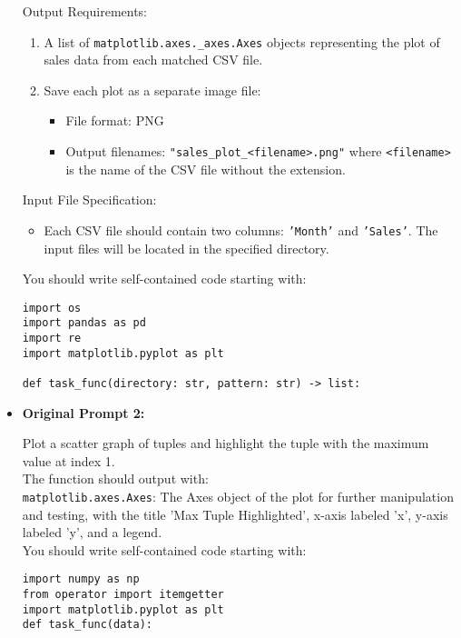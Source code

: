 \begin{itemize}
\begin{tcolorbox}[colback=blue!5!white, colframe=blue!75!black, title=Modified Prompt 1:, text width=\textwidth]
Output Requirements:
\begin{enumerate}
    \item A list of \texttt{matplotlib.axes.\_axes.Axes} objects representing the plot of sales data from each matched CSV file.
    \item Save each plot as a separate image file:
    \begin{itemize}
        \item File format: PNG
        \item Output filenames: \texttt{"sales\_plot\_<filename>.png"} where \texttt{<filename>} is the name of the CSV file without the extension.
    \end{itemize}
\end{enumerate}
Input File Specification:
\begin{itemize}
    \item Each CSV file should contain two columns: \texttt{'Month'} and \texttt{'Sales'}. The input files will be located in the specified directory.
\end{itemize}

You should write self-contained code starting with:
\begin{verbatim}
import os
import pandas as pd
import re
import matplotlib.pyplot as plt

def task_func(directory: str, pattern: str) -> list:
\end{verbatim}

\end{tcolorbox}

\clearpage
\newpage

    
    \item \textbf{Original Prompt 2:}

\begin{tcolorbox}[colback=blue!5!white, colframe=blue!75!black, title=Modified Prompt 1:, text width=\textwidth]
Plot a scatter graph of tuples and highlight the tuple with the maximum value at index 1.\\
The function should output with: \\
\texttt{matplotlib.axes.Axes}: The Axes object of the plot for further manipulation and testing, with the title 'Max Tuple Highlighted', x-axis labeled 'x', y-axis labeled 'y', and a legend.\\
You should write self-contained code starting with:
\begin{verbatim}
import numpy as np
from operator import itemgetter
import matplotlib.pyplot as plt
def task_func(data):
\end{verbatim}
\end{tcolorbox}




\end{itemize}
